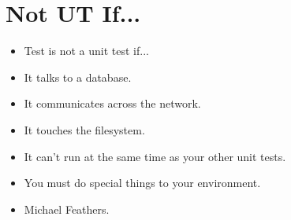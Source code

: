 \documentclass{article}
\begin{document}
\sloppy
\section{Not UT If...}
\begin{itemize}
    \item Test is not a unit test if...
    \item It talks to a database.
    \item It communicates across the network.
    \item It touches the filesystem.
    \item It can't run at the same time as your other unit tests.
    \item You must do special things to your environment.
    \item Michael Feathers.
\end{itemize}
\end{document}
